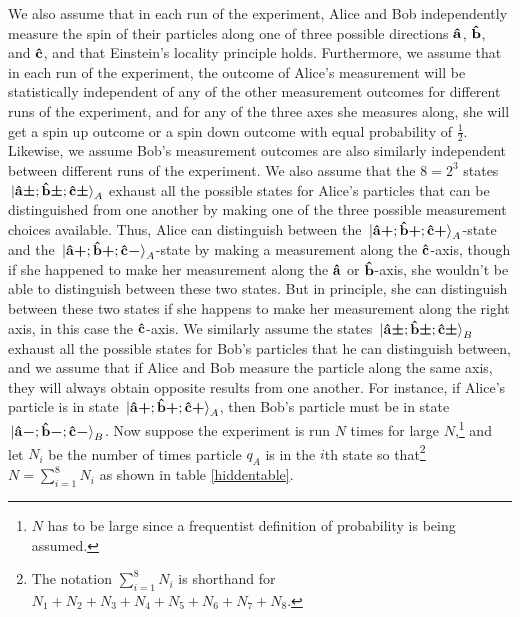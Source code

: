 We also assume that in each run of the experiment, Alice and Bob independently measure the spin of their particles along one of three possible directions $\vb{\hat{{a}}}$, $\vb{\hat{{b}}}$, and $\vb{\hat{{c}}}$, and that Einstein's locality principle holds. Furthermore, we assume that in each run of the experiment, the outcome of Alice's measurement will be statistically independent of any of the other measurement outcomes for different runs of the experiment, and for any of the three axes she measures along, she will get a spin up outcome or a spin down outcome with equal probability of $\frac{1}{2}.$ Likewise, we assume Bob's measurement outcomes are also similarly independent between different runs of the experiment. We also assume that the $8=2^3$ states $\ket*{{\vb{\hat{{a}}}\bm{\pm}};{\vb{\hat{{b}}}\bm{\pm}};{\vb{\hat{{c}}}\bm{\pm}}}_A$ exhaust all the possible states for Alice's particles that can be distinguished from one another by making one of the three possible measurement choices available. Thus, Alice can distinguish between the $\ket*{{\vb{\hat{{a}}}\bm{+}};{\vb{\hat{{b}}}\bm{+}};{\vb{\hat{{c}}}\bm{+}}}_A$-state and the $\ket*{{\vb{\hat{{a}}}\bm{+}};{\vb{\hat{{b}}}\bm{+}};{\vb{\hat{{c}}}\bm{-}}}_A$-state by making a measurement along the $\vb{\hat{{c}}}$-axis, though if she happened to make her measurement along the $\vb{\hat{{a}}}$ or $\vb{\hat{{b}}}$-axis, she wouldn't be able to distinguish between these two states. But in principle, she can distinguish between these two states if she happens to make her measurement along the right axis, in this case the $\vb{\hat{{c}}}$-axis. We similarly assume the states $\ket*{{\vb{\hat{{a}}}\bm{\pm}};{\vb{\hat{{b}}}\bm{\pm}};{\vb{\hat{{c}}}\bm{\pm}}}_B$  exhaust all the possible states for Bob's particles that he can distinguish between, and we assume that if Alice and Bob measure the particle along the same axis, they will always obtain opposite results from one another. For instance, if Alice's particle is in state $\ket*{{\vb{\hat{{a}}}\bm{+}};{\vb{\hat{{b}}}\bm{+}};{\vb{\hat{{c}}}\bm{+}}}_A$, then Bob's particle must be in state $\ket*{{\vb{\hat{{a}}}\bm{-}};{\vb{\hat{{b}}}\bm{-}};{\vb{\hat{{c}}}\bm{-}}}_B$. Now suppose the experiment is run $N$ times for large $N$,\footnote{$N$ has to be large since a frequentist definition of probability is being assumed.} and let $N_i$ be the number of times particle $q_A$ is in the $i$th state so that\footnote{The notation $\sum_{i=1}^8 N_i$ is shorthand for $N_1+N_2+N_3+N_4+N_5+N_6+N_7+N_8$.  %
%
} $N=\sum_{i=1}^8 N_i$ as shown in table \ref{hiddentable}.
      
